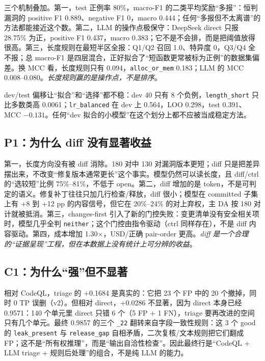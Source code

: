 \documentclass[conference]{IEEEtran}
\begin{document}
三个机制叠加。第一，test 正例率 80\%，macro-F1 的二类平均奖励“多报”：恒判漏洞的 positive F1 0.889、negative F1 0，macro 0.444；任何“多报但不太离谱”的方法都能接近这个数。第二，LLM 的操作点极保守：DeepSeek direct 只报 28.75\% 为正，positive F1 0.437，macro 0.383；它不是不会排，而是把阈值放得很高。第三，长度规则在最短半区全报：Q1/Q2 召回 1.0、特异度 0，Q3/Q4 全不报；总 macro-F1 是四层混合，正好拟合了“短函数更常被标为正例”的数据集偏差。换 MCC 看，长度规则只有 0.094，\texttt{alloc\_or\_mem} 0.183；LLM 的 MCC 0.008--0.080。\emph{长度规则赢的是操作点，不是排序}。

dev/test 偏移让“拟合”和“选择”都不稳：dev 40 只有 8 个负例，\texttt{length\_short} 只比多数类高 0.0061；\texttt{lr\_balanced} 在 dev 上 0.564，LOO 0.298，test 0.391、MCC $-0.131$。任何“dev 拟合的小模型”在这个划分上都不应被当成稳定方法。

\subsection{P1：为什么 diff 没有显著收益}

第一，长度方向没有被 diff 消除。180 对中 130 对漏洞版本更短；diff 只是把差异摆出来，不改变“修复版本通常更长”这个事实。模型仍然可以读长度，且 diff/ctrl 的“选较短”比例 75\%--81\%，不低于 open。第二，diff 增加的是 token，不是可判定的语义。修复补丁往往只加几行检查/释放，diff 很小；模型在 committed 子集上有 +8 到 +12 pp 的内容信号，但它在 20\%--24\% 的对上弃权，主 DA 按 180 对计就被抵消。第三，changes-first 引入了新的门控失败：变更清单没有安全相关项时，模型几乎全判 \texttt{neither}；这个门控由指令驱动（ctrl 同样存在），不是 diff 内容驱动。第四，成本增加 1.30$\times$，USD/正确 pair-order 更高。\emph{diff 是一个合理的“证据呈现”工程，但在本数据上没有统计上可分辨的收益}。

\subsection{C1：为什么“强”但不显著}

相对 CodeQL，triage 的 +0.1684 是真实的：它把 23 个 FP 中的 20 个撤掉，同时 0 TP 误删（v2）。但相对 direct，+0.0286 不显著，因为 direct 本身已经 0.9571：140 个单元里 direct 只错 6 个（5 FP + 1 FN），triage 要再改进的空间只有几个单元。最终 0.9857 的三个 \texttt{\_22} 翻转来自字段一致性规则：这 3 个 good 的 \texttt{leak\_present} 与 \texttt{release\_gap} 自相矛盾，二次复核/文本规则把它们翻成 FP；这不是“所有权推理”，而是“输出自洽性检查”。因此最终行是“CodeQL + LLM triage + 规则后处理”的组合，不是纯 LLM 的能力。
\end{document}
